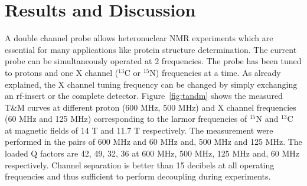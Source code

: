 \documentclass[preprint,12pt]{article}
\begin{document}
\section{Results and Discussion}
A double channel probe allows heteronuclear NMR experiments which are essential for many applications like protein structure determination. The current probe can be simultaneously operated at 2 frequencies. The probe has been tuned to protons and one X channel ($^{13}$C or $^{15}$N) frequencies at a time. As already explained, the X channel tuning frequency can be changed by simply exchanging an rf-insert or the complete detector. Figure~\ref{fig:tandm} shows the measured T\&M curves at different proton (600 MHz, 500 MHz) and X channel frequencies (60 MHz and 125 MHz) corresponding to the larmor frequencies of $^{15}$N and $^{13}$C at magnetic fields of 14 T and 11.7 T respectively. The measurement were performed in the pairs of 600 MHz and 60 MHz and, 500 MHz and 125 MHz. The loaded Q factors are 42, 49, 32, 36 at 600 MHz, 500 MHz, 125 MHz and, 60 MHz respectively. Channel separation is better than 15 decibels at all operating frequencies and thus sufficient to perform decoupling during experiments.\par
\end{document}
